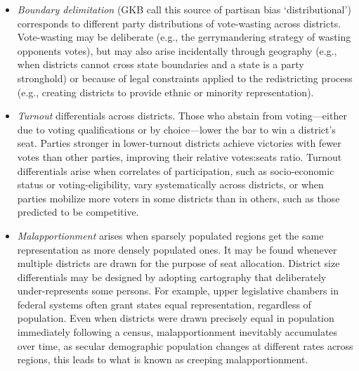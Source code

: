 \documentclass[letter,12pt]{article}
\begin{document}
\begin{itemize}
\item \emph{Boundary delimitation} (GKB call this source of partisan bias `distributional') corresponds to different party distributions of vote-wasting across districts. Vote-wasting may be deliberate (e.g., the gerrymandering strategy of wasting opponents votes), but may also arise incidentally through geography (e.g., when districts cannot cross state boundaries and a state is a party stronghold) or because of legal constraints applied to the redistricting process (e.g., creating districts to provide ethnic or minority representation).
\item \emph{Turnout} differentials across districts. Those who abstain from voting---either due to voting qualifications or by choice---lower the bar to win a district's seat. Parties stronger in lower-turnout districts achieve victories with fewer votes than other parties, improving their relative votes:seats ratio. Turnout differentials arise when correlates of participation, such as socio-economic status or voting-eligibility, vary systematically across districts, or when parties mobilize more voters in some districts than in others, such as those predicted to be competitive.
\item \emph{Malapportionment} arises when sparsely populated regions get the same representation as more densely populated ones. It may be found whenever multiple districts are drawn for the purpose of seat allocation. District size differentials may be designed by adopting cartography that deliberately under-represents some persons. For example, upper legislative chambers in federal systems often grant states equal representation, regardless of population. Even when districts were drawn precisely equal in population immediately following a census, malapportionment inevitably accumulates over time, as secular demographic population changes at different rates across regions, this leads to what is known as creeping malapportionment.
\end{itemize} 

\end{document}
